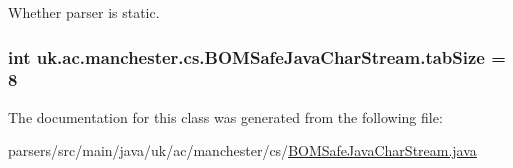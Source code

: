 Whether parser is static. \hypertarget{classuk_1_1ac_1_1manchester_1_1cs_1_1_b_o_m_safe_java_char_stream_a15e060ac26a6067ec0a12b038842d861}{
\subsubsection[{tab\-Size}]{\setlength{\rightskip}{0pt plus 5cm}int uk.\-ac.\-manchester.\-cs.\-B\-O\-M\-Safe\-Java\-Char\-Stream.\-tab\-Size = 8\hspace{0.3cm}{\ttfamily [protected]}}}\label{classuk_1_1ac_1_1manchester_1_1cs_1_1_b_o_m_safe_java_char_stream_a15e060ac26a6067ec0a12b038842d861}


The documentation for this class was generated from the following file\-:\begin{DoxyCompactItemize}
\item 
parsers/src/main/java/uk/ac/manchester/cs/\hyperlink{_b_o_m_safe_java_char_stream_8java}{B\-O\-M\-Safe\-Java\-Char\-Stream.\-java}\end{DoxyCompactItemize}
